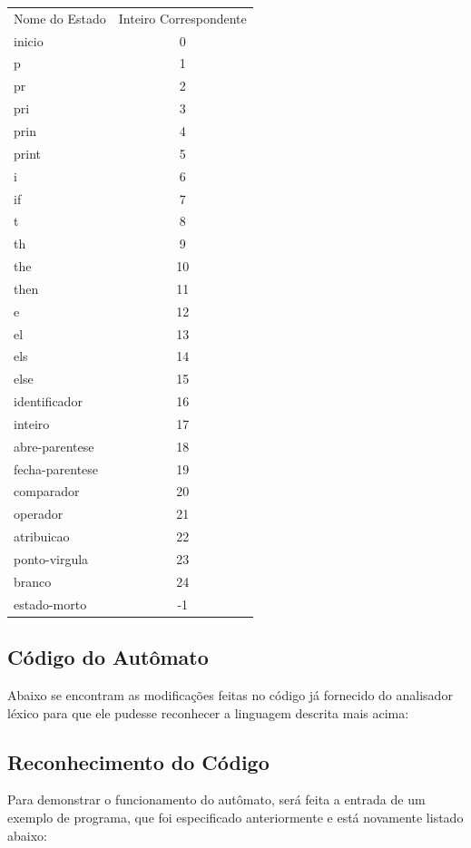 \documentclass[12pt,a4paper,twoside]{report}
\begin{document}
\begin{center}
\begin{tabular} {| l | c |}
\hline
Nome do Estado & Inteiro Correspondente \\
inicio & 0 \\
p & 1 \\
pr & 2 \\
pri & 3 \\
prin & 4 \\
print & 5 \\
i & 6 \\
if & 7 \\
t & 8 \\
th & 9 \\
the & 10 \\
then & 11 \\
e & 12 \\
el & 13 \\
els & 14 \\
else & 15 \\
identificador & 16 \\
inteiro & 17 \\
abre-parentese & 18 \\
fecha-parentese & 19 \\
comparador & 20 \\
operador & 21 \\
atribuicao & 22 \\
ponto-virgula & 23 \\
branco & 24 \\
estado-morto & -1 \\
\hline
\end{tabular}
\end{center}

\subsection{Código do Autômato}
Abaixo se encontram as modificações feitas no código já fornecido do analisador léxico para que ele pudesse reconhecer a linguagem descrita mais acima:



\subsection{Reconhecimento do Código}
Para demonstrar o funcionamento do autômato, será feita a entrada de um exemplo de programa, que foi especificado anteriormente e está novamente listado abaixo:
\end{document}
